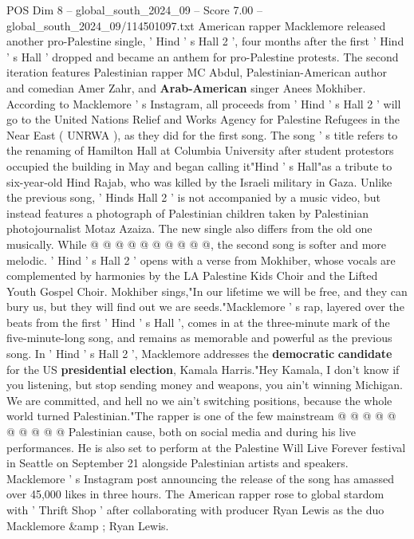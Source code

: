 \begin{textsample}{POS Dim 8 – global\_south\_2024\_09 – Score 7.00 – global\_south\_2024\_09/114501097.txt}  \label{ex:f8_pos_253}
American rapper Macklemore released another pro-Palestine single, ' Hind ' s Hall 2 ', four months after the first ' Hind ' s Hall ' dropped and became an anthem for pro-Palestine protests.
The second iteration features Palestinian rapper MC Abdul, Palestinian-American author and comedian Amer Zahr, and \textbf{Arab-American} singer Anees Mokhiber.
According to Macklemore ' s Instagram, all proceeds from ' Hind ' s Hall 2 ' will go to the United Nations Relief and Works Agency for Palestine Refugees in the Near East ( UNRWA ), as they did for the first song.
The song ' s title refers to the renaming of Hamilton Hall at Columbia University after student protestors occupied the building in May and began calling it"Hind ' s Hall"as a tribute to six-year-old Hind Rajab, who was killed by the Israeli military in Gaza.
Unlike the previous song, ' Hinds Hall 2 ' is not accompanied by a music video, but instead features a photograph of Palestinian children taken by Palestinian photojournalist Motaz Azaiza.
The new single also differs from the old one musically.
While @ @ @ @ @ @ @ @ @ @, the second song is softer and more melodic. ' Hind ' s Hall 2 ' opens with a verse from Mokhiber, whose vocals are complemented by harmonies by the LA Palestine Kids Choir and the Lifted Youth Gospel Choir.
Mokhiber sings,"In our lifetime we will be free, and they can bury us, but they will find out we are seeds."Macklemore ' s rap, layered over the beats from the first ' Hind ' s Hall ', comes in at the three-minute mark of the five-minute-long song, and remains as memorable and powerful as the previous song.
In ' Hind ' s Hall 2 ', Macklemore addresses the \textbf{democratic} \textbf{candidate} for the US \textbf{presidential} \textbf{election}, Kamala Harris."Hey Kamala, I don't know if you listening, but stop sending money and weapons, you ain't winning Michigan.
We are committed, and hell no we ain't switching positions, because the whole world turned Palestinian."The rapper is one of the few mainstream @ @ @ @ @ @ @ @ @ @ Palestinian cause, both on social media and during his live performances.
He is also set to perform at the Palestine Will Live Forever festival in Seattle on September 21 alongside Palestinian artists and speakers.
Macklemore ' s Instagram post announcing the release of the song has amassed over 45,000 likes in three hours.
The American rapper rose to global stardom with ' Thrift Shop ' after collaborating with producer Ryan Lewis as the duo Macklemore \&amp ; Ryan Lewis.

\end{textsample}
